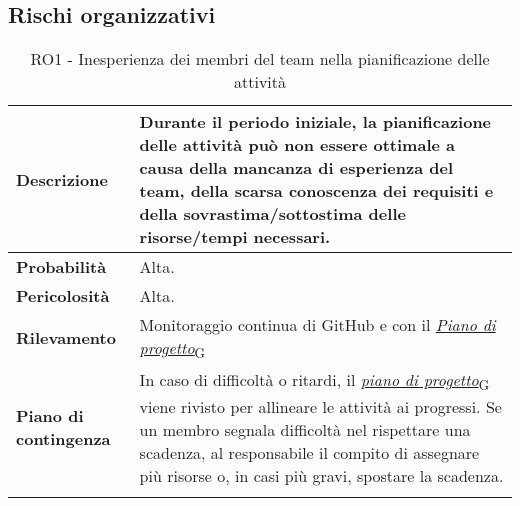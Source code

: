 \clearpage


\subsection{Rischi organizzativi}
\begin{longtable}{ | l | p{10cm} | }
	\hline
	\textbf{Descrizione}          & Durante il periodo iniziale, la pianificazione delle attività può non essere ottimale a causa della mancanza di esperienza del team, della scarsa conoscenza dei requisiti e della sovrastima/sottostima delle risorse/tempi necessari.                                                                                                                                                        \\
	\hline
	\textbf{Probabilità}          & Alta.                                                                                                                                                                                                                                                                                                                                                                                          \\
	\hline
	\textbf{Pericolosità}         & Alta.                                                                                                                                                                                                                                                                                                                                                                                          \\
	\hline
	\textbf{Rilevamento}          & Monitoraggio continua di GitHub e con il \href{https://7last.github.io/docs/rtb/documentazione-interna/glossario#piano-di-progetto}{\textit{Piano di progetto}\textsubscript{G}}                                                                                                                                                                                                               \\
	\hline
	\textbf{Piano di contingenza} & In caso di difficoltà o ritardi, il \href{https://7last.github.io/docs/rtb/documentazione-interna/glossario#piano-di-progetto}{\textit{piano di progetto}\textsubscript{G}} viene rivisto per allineare le attività ai progressi. Se un membro segnala difficoltà nel rispettare una scadenza, al responsabile il compito di assegnare più risorse o, in casi più gravi, spostare la scadenza. \\
	\hline
	\caption{RO1 - Inesperienza dei membri del team nella pianificazione delle attività}
	\label{table:1}
\end{longtable}

